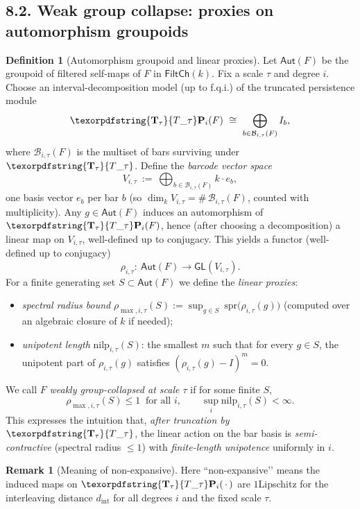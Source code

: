 \documentclass[11pt]{article}
\DeclareRobustCommand{\hyp}{\nobreakdash-}
\numberwithin{equation}{section}
\theoremstyle{definition}
\newtheorem{definition}[theorem]{Definition}
\newtheorem{remark}[theorem]{Remark}
\DeclareRobustCommand{\FiltCh}[1]{\mathsf{FiltCh}(#1)}
\DeclareRobustCommand{\Ttau}{\texorpdfstring{\ensuremath{\mathbf{T}_{\tau}}}{T\_\tau}}
\begin{document}
\subsection*{8.2. Weak group collapse: proxies on automorphism groupoids}
\begin{definition}[Automorphism groupoid and linear proxies]\label{def:group-proxy}
Let \(\mathsf{Aut}(F)\) be the groupoid of filtered self\hyp maps of \(F\) in \(\FiltCh{k}\).
Fix a scale \(\tau\) and degree \(i\).
Choose an interval\hyp decomposition model (up to f.q.i.) of the truncated persistence module
\[
  \Ttau\mathbf{P}_i(F)\ \cong\ \bigoplus_{b\in \mathcal{B}_{i,\tau}(F)} I_b,
\]
where \(\mathcal{B}_{i,\tau}(F)\) is the multiset of bars surviving under \(\Ttau\).
Define the \emph{barcode vector space}
\[
  V_{i,\tau}\ :=\ \bigoplus_{b\in \mathcal{B}_{i,\tau}(F)} k\cdot e_b,
\]
one basis vector \(e_b\) per bar \(b\) (so \(\dim_k V_{i,\tau}=\#\,\mathcal{B}_{i,\tau}(F)\), counted with multiplicity).
Any \(g\in \mathsf{Aut}(F)\) induces an automorphism of \(\Ttau\mathbf{P}_i(F)\), hence (after choosing a decomposition) a linear map on \(V_{i,\tau}\), well\hyp defined up to conjugacy.
This yields a functor (well\hyp defined up to conjugacy)
\[
  \rho_{i,\tau}:\ \mathsf{Aut}(F)\longrightarrow \mathsf{GL}(V_{i,\tau}).
\]
For a finite generating set \(S\subset \mathsf{Aut}(F)\) we define the \emph{linear proxies}:
\begin{itemize}
  \item \emph{spectral radius bound} \(\rho_{\max,i,\tau}(S):=\sup_{g\in S}\ \mathrm{spr}\big(\rho_{i,\tau}(g)\big)\) (computed over an algebraic closure of \(k\) if needed);
  \item \emph{unipotent length} \(\mathrm{nilp}_{i,\tau}(S)\): the smallest \(m\) such that for every \(g\in S\), the unipotent part of \(\rho_{i,\tau}(g)\) satisfies \((\rho_{i,\tau}(g)-I)^{m}=0\).
\end{itemize}
We call \(F\) \emph{weakly group\hyp collapsed at scale \(\tau\)} if for some finite \(S\),
\[
  \rho_{\max,i,\tau}(S)\le 1\ \text{ for all \(i\)},\qquad \sup_i \mathrm{nilp}_{i,\tau}(S)<\infty.
\]
This expresses the intuition that, \emph{after truncation by \(\Ttau\)}, the linear action on the bar basis is \emph{semi\hyp contractive} (spectral radius \(\le 1\)) with \emph{finite\hyp length unipotence} uniformly in \(i\).
\end{definition}

\begin{remark}[Meaning of non\hyp expansive]\label{rk:nonexp-meaning}
Here “non\hyp expansive’’ means the induced maps on \(\Ttau\mathbf{P}_i(\,{\cdot}\,)\) are \(1\)\nobreakdash Lipschitz for the interleaving distance \(d_{\mathrm{int}}\) for all degrees \(i\) and the fixed scale \(\tau\).
\end{remark}
\end{document}
